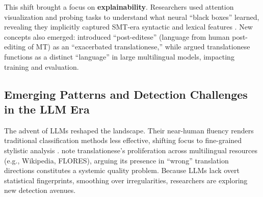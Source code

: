 \documentclass[11pt,a4paper]{article}
\begin{document}
This shift brought a focus on \textbf{explainability}. Researchers used attention visualization and probing tasks to understand what neural ``black boxes'' learned, revealing they implicitly captured SMT-era syntactic and lexical features \cite{amponsah2022explaining}. New concepts also emerged: \citet{toral2019post} introduced ``post-editese'' (language from human post-editing of MT) as an ``exacerbated translationese,'' while \citet{riley2020translationese} argued translationese functions as a distinct ``language'' in large multilingual models, impacting training and evaluation.

\subsection{Emerging Patterns and Detection Challenges in the LLM Era}

The advent of LLMs reshaped the landscape. Their near-human fluency renders traditional classification methods less effective, shifting focus to fine-grained stylistic analysis \cite{wang2024benchmarking,dutta2022towards}. \citet{church2025emerging} note translationese's proliferation across multilingual resources (e.g., Wikipedia, FLORES), arguing its presence in ``wrong'' translation directions constitutes a systemic quality problem. Because LLMs lack overt statistical fingerprints, smoothing over irregularities, researchers are exploring new detection avenues.
\end{document}
